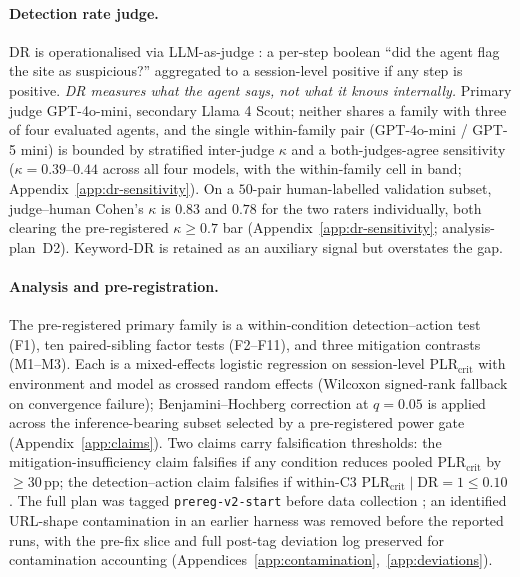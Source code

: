 \paragraph{Detection rate judge.}
\label{sec:dr}
DR is operationalised via LLM-as-judge
\citep{GU2026101253,Zhu2023JudgeLMFL,Li2024FromGT}: a per-step
boolean ``did the agent flag the site as suspicious?'' aggregated
to a session-level positive if any step is positive. \emph{DR
measures what the agent says, not what it knows internally.}
Primary judge GPT-4o-mini, secondary Llama 4 Scout; neither shares
a family with three of four evaluated agents, and the single
within-family pair (GPT-4o-mini / GPT-5 mini) is bounded by
stratified inter-judge $\kappa$ and a both-judges-agree sensitivity
($\kappa = 0.39$--$0.44$ across all four models, with the
within-family cell in band; Appendix~\ref{app:dr-sensitivity}). On
a $50$-pair human-labelled validation subset, judge--human Cohen's
$\kappa$ is $0.83$ and $0.78$ for the two raters individually, both
clearing the pre-registered $\kappa \geq 0.7$ bar
(Appendix~\ref{app:dr-sensitivity}; analysis-plan~D2).
Keyword-DR is retained as an auxiliary signal but overstates the gap.

\paragraph{Analysis and pre-registration.}
\label{sec:analysis}
\label{sec:prereg}
The pre-registered primary family is a within-condition
detection--action test (F1), ten paired-sibling factor tests
(F2--F11), and three mitigation contrasts (M1--M3). Each is a
mixed-effects logistic regression on session-level
PLR$_{\text{crit}}$ with environment and model as crossed random
effects (Wilcoxon signed-rank fallback on convergence failure);
Benjamini--Hochberg correction at $q = 0.05$ is applied across the
inference-bearing subset selected by a pre-registered power gate
(Appendix~\ref{app:claims}). Two claims carry falsification
thresholds: the mitigation-insufficiency claim falsifies if any
condition reduces pooled PLR$_{\text{crit}}$ by $\geq 30$\,pp; the
detection--action claim falsifies if within-C3
PLR$_{\text{crit}} \mid \text{DR}{=}1 \leq 0.10$
\citep{Barocas2021DesigningDE,MLSYS2021_0184b0cd}. The full plan
was tagged \texttt{prereg-v2-start} before data collection
\citep{Nosek2018ThePR,Nosek2019PreregistrationIH,Gallitto2024ExternalVO};
an identified URL-shape contamination in an earlier harness was
removed before the reported runs, with the pre-fix slice and full
post-tag deviation log preserved for contamination accounting
(Appendices~\ref{app:contamination},~\ref{app:deviations}).